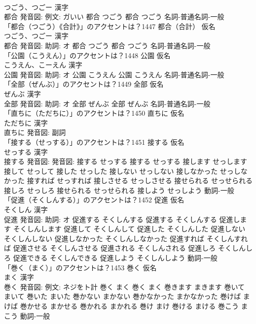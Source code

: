 \documentclass[8pt]{extreport}
\begin{document}
\begin{CJK}{UTF8}{min}
\\	つごう、つごー 漢字　
\\	都合 発音図: 例文: ガいい	都合 つごう		都合 つごう				名詞-普通名詞-一般 
\\	「都合（つごう）《合計》」のアクセントは？1447	都合（合計） 仮名　
\\	つごう、つごー 漢字　
\\	都合 発音図: 助詞: オ	都合 つごう		都合 つごう				名詞-普通名詞-一般 
\\	「公園（こうえん）」のアクセントは？1448	公園 仮名　
\\	こうえん、こーえん 漢字　
\\	公園 発音図: 助詞: オ	公園 こうえん		公園 こうえん				名詞-普通名詞-一般 
\\	「全部（ぜんぶ）」のアクセントは？1449	全部 仮名　
\\	ぜんぶ 漢字　
\\	全部 発音図: 助詞: オ	全部 ぜんぶ		全部 ぜんぶ				名詞-普通名詞-一般 
\\	「直ちに（ただちに）」のアクセントは？1450	直ちに 仮名　
\\	ただちに 漢字　
\\	直ちに 発音図:							副詞 
\\	「接する（せっする）」のアクセントは？1451	接する 仮名　
\\	せっする 漢字　
\\	接する 発音図: 発音図:	接する せっする		接する せっする 接します せっします 接して せっして 接した せっした 接しない せっしない 接しなかった せっしなかった 接すれば せっすれば 接しさせる せっしさせる 接せられる せっせられる 接しろ せっしろ 接せられる せっせられる 接しよう せっしよう				動詞-一般 
\\	「促進（そくしんする）」のアクセントは？1452	促進 仮名　
\\	そくしん 漢字　
\\	促進 発音図: 助詞: オ	促進する そくしんする		促進する そくしんする 促進します そくしんします 促進して そくしんして 促進した そくしんした 促進しない そくしんしない 促進しなかった そくしんしなかった 促進すれば そくしんすれば 促進させる そくしんさせる 促進される そくしんされる 促進しろ そくしんしろ 促進できる そくしんできる 促進しよう そくしんしよう				動詞-一般 
\\	「巻く（まく）」のアクセントは？1453	巻く 仮名　
\\	まく 漢字　
\\	巻く 発音図: 例文: ネジをト計	巻く まく		巻く まく 巻きます まきます 巻いて まいて 巻いた まいた 巻かない まかない 巻かなかった まかなかった 巻けば まけば 巻かせる まかせる 巻かれる まかれる 巻け まけ 巻ける まける 巻こう まこう				動詞-一般 

\end{CJK}
\end{document}

